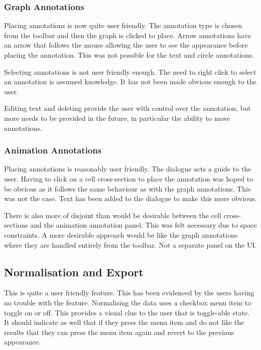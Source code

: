 \subsubsection{Graph Annotations}

Placing annotations is now quite user friendly.  The annotation type is chosen from the toolbar and then the graph is clicked to place.  Arrow annotations have an arrow that follows the mouse allowing the user to see the appearance before placing the annotation.  This was not possible for the text and circle annotations.

Selecting annotations is not user friendly enough.  The need to right click to select an annotation is assumed knowledge.  It has not been made obvious enough to the user.

Editing text and deleting provide the user with control over the annotation, but more needs to be provided in the future, in particular the ability to move annotations.

\subsubsection{Animation Annotations}

Placing annotations is reasonably user friendly.  The dialogue acts a guide to the user.  Having to click on a cell cross-section to place the annotation was hoped to be obvious as it follows the same behaviour as with the graph annotations.  This was not the case.  Text has been added to the dialogue to make this more obvious.

There is also more of disjoint than would be desirable between the cell cross-sections and the animation annotation panel.  This was felt necessary due to space constraints.  A more desirable approach would be like the graph annotations where they are handled entirely from the toolbar.  Not a separate panel on the \ac{UI}.

\subsection{Normalisation and Export}

This is quite a user friendly feature.  This has been evidenced by the users having no trouble with the feature.  Normalising the data uses a checkbox menu item to toggle on or off.  This provides a visual clue to the user that is toggle-able state.  It should indicate as well that if they press the menu item and do not like the results that they can press the menu item again and revert to the previous appearance.

